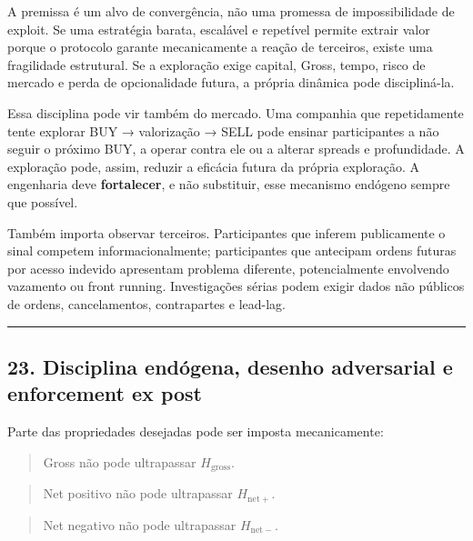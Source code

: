 \documentclass[
  a4paper,
]{article}
\begin{document}
A premissa é um alvo de convergência, não uma promessa de
impossibilidade de exploit. Se uma estratégia barata, escalável e
repetível permite extrair valor porque o protocolo garante mecanicamente
a reação de terceiros, existe uma fragilidade estrutural. Se a
exploração exige capital, Gross, tempo, risco de mercado e perda de
opcionalidade futura, a própria dinâmica pode discipliná-la.

Essa disciplina pode vir também do mercado. Uma companhia que
repetidamente tente explorar BUY → valorização → SELL pode ensinar
participantes a não seguir o próximo BUY, a operar contra ele ou a
alterar spreads e profundidade. A exploração pode, assim, reduzir a
eficácia futura da própria exploração. A engenharia deve
\textbf{fortalecer}, e não substituir, esse mecanismo endógeno sempre
que possível.

Também importa observar terceiros. Participantes que inferem
publicamente o sinal competem informacionalmente; participantes que
antecipam ordens futuras por acesso indevido apresentam problema
diferente, potencialmente envolvendo vazamento ou front running.
Investigações sérias podem exigir dados não públicos de ordens,
cancelamentos, contrapartes e lead-lag.

\begin{center}\rule{0.5\linewidth}{0.5pt}\end{center}

\hypertarget{23-disciplina-endogena-e-enforcement-ex-post}{}

\hypertarget{23-disciplina-enduxf3gena-desenho-adversarial-e-enforcement-ex-post}{%
\subsection{23. Disciplina endógena, desenho adversarial e enforcement
ex
post}\label{23-disciplina-enduxf3gena-desenho-adversarial-e-enforcement-ex-post}}

Parte das propriedades desejadas pode ser imposta mecanicamente:

\begin{quote}
Gross não pode ultrapassar \(H_{\mathrm{gross}}\).
\end{quote}

\begin{quote}
Net positivo não pode ultrapassar \(H_{\mathrm{net}+}\).
\end{quote}

\begin{quote}
Net negativo não pode ultrapassar \(H_{\mathrm{net}-}\).
\end{quote}
\end{document}
